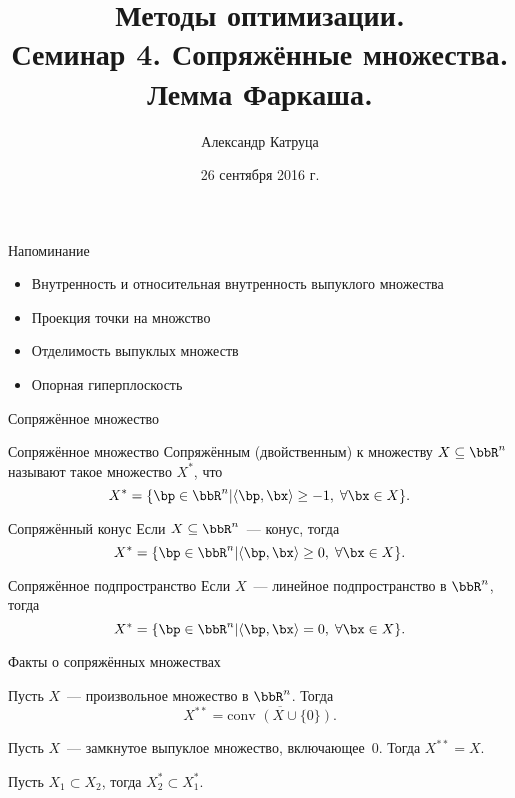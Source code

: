 \documentclass[12pt,russian]{beamer}
\title[Семинар 4]{Методы оптимизации. \\
 Семинар 4. Сопряжённые множества. Лемма Фаркаша.}
\author{Александр Катруца}
\institute{Московский физико-технический институт,\\
Факультет Управления и Прикладной Математики}
\date{26 сентября 2016 г.}
\begin{document}
\begin{frame}
\maketitle
\end{frame}

\begin{frame}{Напоминание}
\begin{itemize}
\item Внутренность и относительная внутренность выпуклого множества
\item Проекция точки на множство
\item Отделимость выпуклых множеств
\item Опорная гиперплоскость
\end{itemize}
\end{frame}

\begin{frame}{Сопряжённое множество}
\begin{block}{Сопряжённое множество}
Сопряжённым (двойственным) к множеству $X \subseteq \bbR^n$ называют такое множество $X^*$, что
\vspace{-4mm}
\[
X^* = \{ \bp \in \bbR^n | \langle \bp, \bx \rangle \geq -1, \; \forall \bx \in X \}.
\]
\end{block}

\begin{block}{Сопряжённый конус}
Если $X \subseteq \bbR^n$~--- конус, тогда
\vspace{-4mm} 
\[
X^* = \{ \bp \in \bbR^n | \langle \bp, \bx \rangle \geq 0, \; \forall \bx \in X \}.
\]
\end{block}

\begin{block}{Сопряжённое подпространство}
Если $X$~--- линейное подпространство в $\bbR^n$, тогда 
\vspace{-4mm} 
\[
X^* = \{ \bp \in \bbR^n | \langle \bp, \bx \rangle = 0, \; \forall \bx \in X \}.
\]
\end{block}
\end{frame}

\begin{frame}{Факты о сопряжённых множествах}
\begin{theorem}
Пусть $X$~--- произвольное множество в $\bbR^n$. Тогда
\vspace{-4mm}
\[
X^{**} = \overline{\text{conv }(X \cup \{0\})}.
\] 
\end{theorem}

\begin{theorem}
Пусть $X$~--- замкнутое выпуклое множество, включающее~0. Тогда $X^{**} = X$.
\end{theorem}

\begin{theorem}
Пусть $X_1 \subset X_2$, тогда $X^*_2 \subset X^*_1$.
\end{theorem}
\end{frame}
\end{document}
